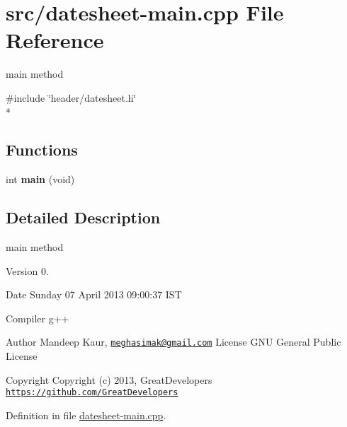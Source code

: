 \hypertarget{datesheet-main_8cpp}{\section{src/datesheet-\/main.cpp File Reference}
\label{datesheet-main_8cpp}
}


main method  


{\ttfamily \#include \char`\"{}header/datesheet.\-h\char`\"{}}\\*
\subsection*{Functions}
\begin{DoxyCompactItemize}
\item 
\hypertarget{datesheet-main_8cpp_a840291bc02cba5474a4cb46a9b9566fe}{int {\bfseries main} (void)}\label{datesheet-main_8cpp_a840291bc02cba5474a4cb46a9b9566fe}

\end{DoxyCompactItemize}


\subsection{Detailed Description}
main method \begin{DoxyVersion}{Version}
0. 
\end{DoxyVersion}
\begin{DoxyDate}{Date}
Sunday 07 April 2013 09\-:00\-:37 I\-S\-T\par
 Compiler g++
\end{DoxyDate}
\begin{DoxyAuthor}{Author}
Mandeep Kaur, \href{mailto:meghasimak@gmail.com}{\tt meghasimak@gmail.\-com} License G\-N\-U General Public License 
\end{DoxyAuthor}
\begin{DoxyCopyright}{Copyright}
Copyright (c) 2013, Great\-Developers \href{https://github.com/GreatDevelopers}{\tt https\-://github.\-com/\-Great\-Developers} 
\end{DoxyCopyright}


Definition in file \hyperlink{datesheet-main_8cpp_source}{datesheet-\/main.\-cpp}.

